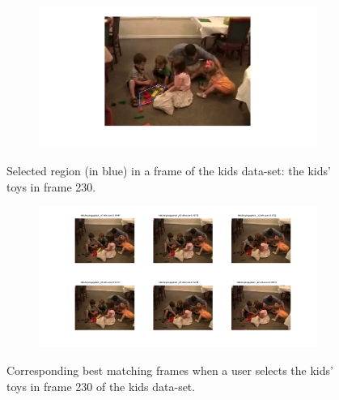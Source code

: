 \documentclass{paper}
\begin{document}
\begin{figure}[!htbp]
\centering
\begin{subfigure}{1.0\textwidth}
\includegraphics[width=\textwidth]{figures/region_queries/kids/selectionRegQ_230}
\end{subfigure}
\caption{Selected region (in blue) in a frame of the kids data-set: the kids' toys in frame 230.}
\label{fig:kids_regionquery_sel2}
\end{figure}

\begin{figure}[!htbp]
\centering
\begin{subfigure}{1.0\textwidth}
\includegraphics[width=\textwidth]{figures/region_queries/kids/matchesRegQ_230}
\end{subfigure}
\caption{Corresponding best matching frames when a user selects the kids' toys in frame 230 of the kids data-set.}
\label{fig:kids_regionquery_matches2}
\end{figure}
\end{document}
